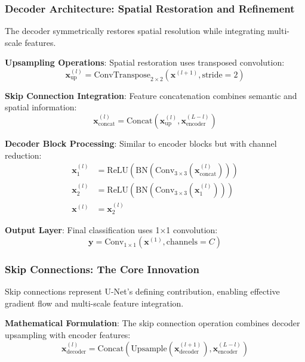 \documentclass[12pt,a4paper]{article}
\begin{document}
\subsubsection{Decoder Architecture: Spatial Restoration and Refinement}

The decoder symmetrically restores spatial resolution while integrating multi-scale features.

\textbf{Upsampling Operations}:
Spatial restoration uses transposed convolution:
\begin{equation}
\mathbf{x}^{(l)}_{\text{up}} = \text{ConvTranspose}_{2\times2}(\mathbf{x}^{(l+1)}, \text{stride}=2)
\end{equation}

\textbf{Skip Connection Integration}:
Feature concatenation combines semantic and spatial information:
\begin{equation}
\mathbf{x}^{(l)}_{\text{concat}} = \text{Concat}(\mathbf{x}^{(l)}_{\text{up}}, \mathbf{x}^{(L-l)}_{\text{encoder}})
\end{equation}

\textbf{Decoder Block Processing}:
Similar to encoder blocks but with channel reduction:
\begin{align}
\mathbf{x}^{(l)}_{1} &= \text{ReLU}(\text{BN}(\text{Conv}_{3\times3}(\mathbf{x}^{(l)}_{\text{concat}}))) \\
\mathbf{x}^{(l)}_{2} &= \text{ReLU}(\text{BN}(\text{Conv}_{3\times3}(\mathbf{x}^{(l)}_{1}))) \\
\mathbf{x}^{(l)} &= \mathbf{x}^{(l)}_{2}
\end{align}

\textbf{Output Layer}:
Final classification uses 1×1 convolution:
\begin{equation}
\mathbf{y} = \text{Conv}_{1\times1}(\mathbf{x}^{(1)}, \text{channels}=C)
\end{equation}

\subsubsection{Skip Connections: The Core Innovation}

Skip connections represent U-Net's defining contribution, enabling effective gradient flow and multi-scale feature integration.

\textbf{Mathematical Formulation}:
The skip connection operation combines decoder upsampling with encoder features:
\begin{equation}
\mathbf{x}^{(l)}_{\text{decoder}} = \text{Concat}\left( \text{Upsample}(\mathbf{x}^{(l+1)}_{\text{decoder}}), \mathbf{x}^{(L-l)}_{\text{encoder}} \right)
\end{equation}
\end{document}
